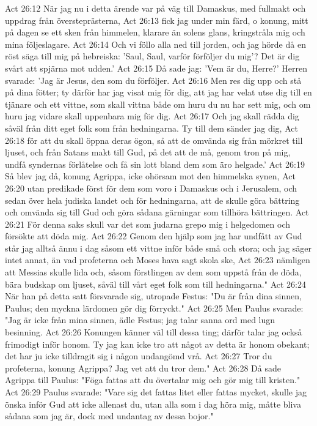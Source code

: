 Act 26:12  När jag nu i detta ärende var på väg till Damaskus, med fullmakt och uppdrag från översteprästerna,
Act 26:13  fick jag under min färd, o konung, mitt på dagen se ett sken från himmelen, klarare än solens glans, kringstråla mig och mina följeslagare.
Act 26:14  Och vi föllo alla ned till jorden, och jag hörde då en röst säga till mig på hebreiska: 'Saul, Saul, varför förföljer du mig'? Det är dig svårt att spjärna mot udden.'
Act 26:15  Då sade jag: 'Vem är du, Herre?' Herren svarade: 'Jag är Jesus, den som du förföljer.
Act 26:16  Men res dig upp och stå på dina fötter; ty därför har jag visat mig för dig, att jag har velat utse dig till en tjänare och ett vittne, som skall vittna både om huru du nu har sett mig, och om huru jag vidare skall uppenbara mig för dig.
Act 26:17  Och jag skall rädda dig såväl från ditt eget folk som från hedningarna. Ty till dem sänder jag dig,
Act 26:18  för att du skall öppna deras ögon, så att de omvända sig från mörkret till ljuset, och från Satans makt till Gud, på det att de må, genom tron på mig, undfå syndernas förlåtelse och få sin lott bland dem som äro helgade.'
Act 26:19  Så blev jag då, konung Agrippa, icke ohörsam mot den himmelska synen,
Act 26:20  utan predikade först för dem som voro i Damaskus och i Jerusalem, och sedan över hela judiska landet och för hedningarna, att de skulle göra bättring och omvända sig till Gud och göra sådana gärningar som tillhöra bättringen.
Act 26:21  För denna saks skull var det som judarna grepo mig i helgedomen och försökte att döda mig.
Act 26:22  Genom den hjälp som jag har undfått av Gud står jag alltså ännu i dag såsom ett vittne inför både små och stora; och jag säger intet annat, än vad profeterna och Moses hava sagt skola ske,
Act 26:23  nämligen att Messias skulle lida och, såsom förstlingen av dem som uppstå från de döda, bära budskap om ljuset, såväl till vårt eget folk som till hedningarna."
Act 26:24  När han på detta satt försvarade sig, utropade Festus: "Du är från dina sinnen, Paulus; den myckna lärdomen gör dig förryckt."
Act 26:25  Men Paulus svarade: "Jag är icke från mina sinnen, ädle Festus; jag talar sanna ord med lugn besinning.
Act 26:26  Konungen känner väl till dessa ting; därför talar jag också frimodigt inför honom. Ty jag kan icke tro att något av detta är honom obekant; det har ju icke tilldragit sig i någon undangömd vrå.
Act 26:27  Tror du profeterna, konung Agrippa? Jag vet att du tror dem."
Act 26:28  Då sade Agrippa till Paulus: "Föga fattas att du övertalar mig och gör mig till kristen."
Act 26:29  Paulus svarade: "Vare sig det fattas litet eller fattas mycket, skulle jag önska inför Gud att icke allenast du, utan alla som i dag höra mig, måtte bliva sådana som jag är, dock med undantag av dessa bojor."
